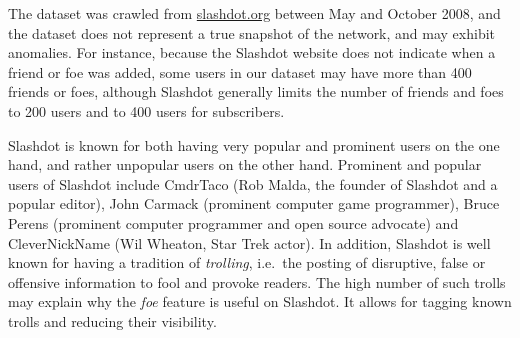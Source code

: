 \documentclass[11pt,a4paper]{book}
\begin{document}
The dataset was crawled from \href{http://slashdot.org/}{slashdot.org}
between May and October 2008, and the dataset 
does not represent a true snapshot of the network, and may exhibit
anomalies.  For instance, 
because the Slashdot website does not indicate when a friend or foe was
added, 
some users in our dataset may have more than 400
friends or foes, although Slashdot generally limits the number of
friends and foes to 200 users and to 400 users for subscribers.

Slashdot is known for both having very popular and prominent users on
the one hand, and rather unpopular users on the other hand.
Prominent and popular users of Slashdot include CmdrTaco (Rob Malda,
the founder of Slashdot and a popular editor), John Carmack (prominent
computer game programmer), Bruce Perens (prominent computer programmer
and open source advocate) and CleverNickName (Wil Wheaton, Star Trek
actor).  
In addition, Slashdot is well known for having a tradition of
\emph{trolling}, i.e.\ the posting of disruptive, false or offensive
information to fool 
and provoke readers.  
The high number of such trolls may explain why the \emph{foe} feature is
useful on Slashdot.  It allows for tagging known trolls and reducing
their visibility.   
\end{document}
